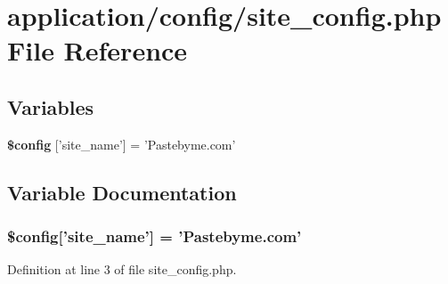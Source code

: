 \section{application/config/site\-\_\-config.php File Reference}
\label{site__config_8php}
\subsection*{Variables}
\begin{DoxyCompactItemize}
\item 
{\bf \$config} ['site\-\_\-name'] = 'Pastebyme.\-com'
\end{DoxyCompactItemize}


\subsection{Variable Documentation}
\subsubsection[{\$config}]{\setlength{\rightskip}{0pt plus 5cm}\$config['site\-\_\-name'] = 'Pastebyme.\-com'}\label{site__config_8php_aec04da994bcb63f1303d192f60e2f666}


Definition at line 3 of file site\-\_\-config.\-php.

